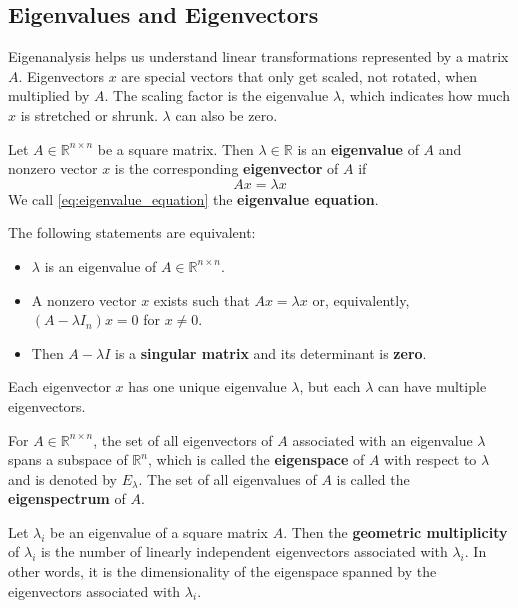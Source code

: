 \documentclass{article}
\begin{document}
\subsection{Eigenvalues and Eigenvectors}
Eigenanalysis helps us understand linear transformations represented by a
matrix $A$. Eigenvectors $x$ are special vectors that only get scaled, not
rotated, when multiplied by $A$. The scaling factor is the eigenvalue
$\lambda$, which indicates how much $x$ is stretched or shrunk. $\lambda$ can
also be zero.
\begin{definition}
    Let $A\in \mathbb{R}^{n\times n}$ be a square matrix. Then $\lambda\in
    \mathbb{R}$ is an \textbf{eigenvalue} of $A$ and nonzero vector $x$ is the
    corresponding \textbf{eigenvector} of $A$ if 
    \begin{equation}\label{eq:eigenvalue_equation}
        Ax=\lambda x
    \end{equation}
    We call \ref{eq:eigenvalue_equation} the \textbf{eigenvalue equation}.
\end{definition}
The following statements are equivalent:
\begin{itemize}
    \item $\lambda$ is an eigenvalue of $A\in \mathbb{R}^{n\times n}$.
    \item A nonzero vector $x$ exists such that $Ax=\lambda x$ or,
        equivalently, $(A-\lambda I_n)x=0$ for $x\neq 0$.
    \item Then $A-\lambda I$ is a \textbf{singular
        matrix} and its determinant is \textbf{zero}.
\end{itemize}
Each eigenvector $x$ has one unique eigenvalue $\lambda$, but each $\lambda$
can have multiple eigenvectors.
\begin{definition}
    For $A\in \mathbb{R}^{n\times n}$, the set of all eigenvectors of $A$
    associated with an eigenvalue $\lambda$ spans a subspace of
    $\mathbb{R}^n$, which is called the \textbf{eigenspace} of $A$ with
    respect to $\lambda$ and is denoted by $E_{\lambda}$. The set of all
    eigenvalues of $A$ is called the \textbf{eigenspectrum} of $A$.
\end{definition}
\begin{definition}
    Let $\lambda_i$ be an eigenvalue of a square matrix $A$. Then the
    \textbf{geometric multiplicity} of $\lambda_i$ is the number of linearly
    independent eigenvectors associated with $\lambda_{i}$. In other words, it
    is the dimensionality of the eigenspace spanned by the eigenvectors
    associated with $\lambda_i$.
\end{definition}
\end{document}
